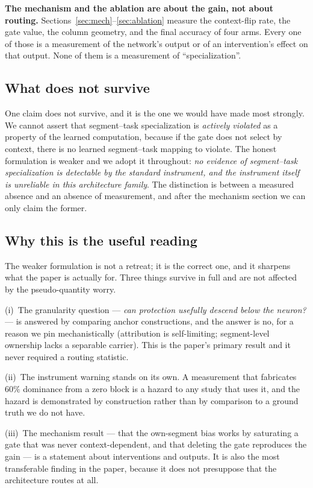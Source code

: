 \documentclass[review,12pt,number]{elsarticle}
\begin{document}
\textbf{The mechanism and the ablation are about the gain, not about
routing.} Sections~\ref{sec:mech}--\ref{sec:ablation} measure the
context-flip rate, the gate value, the column geometry, and the final
accuracy of four arms. Every one of those is a measurement of the
network's output or of an intervention's effect on that output. None of
them is a measurement of ``specialization''.

\subsection{What does not survive}

One claim does not survive, and it is the one we would have made most
strongly. We cannot assert that segment--task specialization is
\emph{actively violated} as a property of the learned computation, because
if the gate does not select by context, there is no learned
segment--task mapping to violate. The honest formulation is weaker and
we adopt it throughout: \emph{no evidence of segment--task specialization
is detectable by the standard instrument, and the instrument itself is
unreliable in this architecture family}. The distinction is between a
measured absence and an absence of measurement, and after the mechanism
section we can only claim the former.

\subsection{Why this is the useful reading}

The weaker formulation is not a retreat; it is the correct one, and it
sharpens what the paper is actually for. Three things survive in full
and are not affected by the pseudo-quantity worry.

(i)~The granularity question --- \emph{can protection usefully descend
below the neuron?} --- is answered by comparing anchor constructions, and
the answer is no, for a reason we pin mechanistically (attribution is
self-limiting; segment-level ownership lacks a separable carrier). This
is the paper's primary result and it never required a routing statistic.

(ii)~The instrument warning stands on its own. A measurement that
fabricates $60\%$ dominance from a zero block is a hazard to any study
that uses it, and the hazard is demonstrated by construction rather than
by comparison to a ground truth we do not have.

(iii)~The mechanism result --- that the own-segment bias works by
saturating a gate that was never context-dependent, and that deleting the
gate reproduces the gain --- is a statement about interventions and
outputs. It is also the most transferable finding in the paper, because
it does not presuppose that the architecture routes at all.
\end{document}
